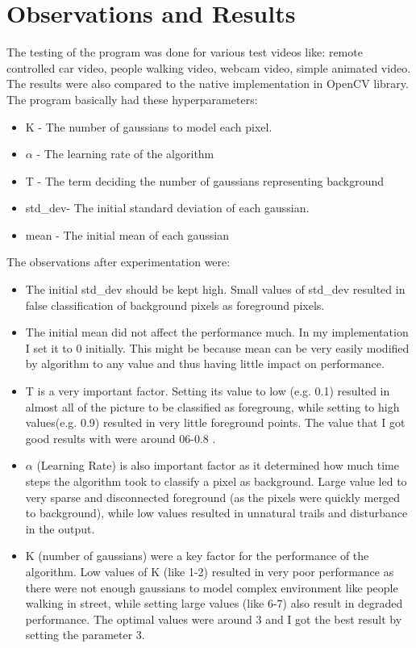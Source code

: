 \documentclass[12pt]{article}
\begin{document}
\section{Observations and Results}
The testing of the program was done for various test videos like: remote controlled car video, people walking video,
webcam video, simple animated video. The results were also compared to the native implementation in OpenCV library.\\
The program basically had these hyperparameters:
\begin{itemize}
    \item K - The number of gaussians to model each pixel.
    \item $\alpha$ - The learning rate of the algorithm
    \item T - The term deciding the number of gaussians representing background
    \item std\_dev- The initial standard deviation of each gaussian.
    \item mean - The initial mean of each gaussian
\end{itemize}
The observations after experimentation were:
\begin{itemize}
    \item The initial std\_dev should be kept high. Small values of std\_dev resulted in false classification of background pixels
        as foreground pixels.
    \item The initial mean did not affect the performance much. In my implementation I set it to 0 initially. This might be because
        mean can be very easily modified by algorithm to any value and thus having little impact on performance.
    \item T is a very important factor. Setting its value to low (e.g. 0.1) resulted in almost all of the picture to be classified as
        foregroung, while setting to high values(e.g. 0.9) resulted in very little foreground points. The value that I got good 
        results with were around 06-0.8 .
    \item $\alpha$ (Learning Rate) is also important factor as it determined how much time steps the algorithm took to classify a pixel
        as background. Large value led to very sparse and disconnected foreground (as the pixels were quickly merged to background), while
        low values resulted in unnatural trails and disturbance in the output.
    \item K (number of gaussians) were a key factor for the performance of the algorithm. Low values of K (like 1-2) resulted in very poor
        performance as there were not enough gaussians to model complex environment like people walking in street, while setting large values
        (like 6-7) also result in degraded performance. The optimal values were around 3 and I got the best result by setting the parameter 3.
\end{itemize}
\end{document}
